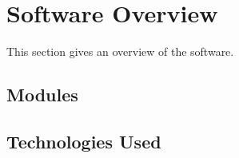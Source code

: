 \section{Software Overview}

This section gives an overview of the software.

\subsection{Modules}
\lipsum[3]

\subsection{Technologies Used}
\lipsum[4]

